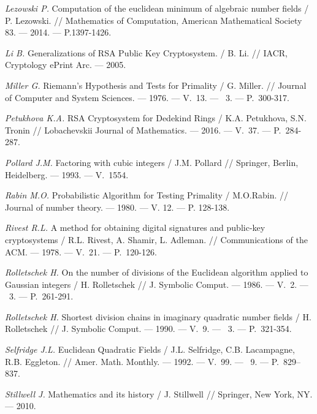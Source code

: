 \begin{thebibliography}{99}
    \textit{Lezowski P.} Computation of the euclidean minimum of algebraic number fields / P. Lezowski. // Mathematics of Computation, American Mathematical Society 83. --- 2014. --- P.1397-1426.

    \textit{Li B.} Generalizations of RSA Public Key Cryptosystem. / B. Li. // IACR, Cryptology ePrint Arc. --- 2005.

    \textit{Miller G.} Riemann's Hypothesis and Tests for Primality / G. Miller. // Journal of Computer and System Sciences. --- 1976. --- V.~13. --- ~3. --- {P.}~300-317.
    
    \textit{Petukhova K.A.} RSA Cryptosystem for Dedekind Rings / K.A. Petukhova, S.N. Tronin // Lobachevskii Journal of Mathematics. --- 2016. --- V.~37. --- P.~284-287.
    
    \textit{Pollard J.M.} Factoring with cubic integers / J.M. Pollard // Springer, Berlin, Heidelberg. --- 1993. --- V.~1554.

    \textit{Rabin M.O.} Probabilistic Algorithm for Testing Primality / M.O.Rabin. // Journal of number theory. --- 1980. --- V. 12. --- P. 128-138.
    
    \textit{Rivest R.L.} A method for obtaining digital signatures and public-key cryptosystems / R.L. Rivest, A. Shamir, L. Adleman. // Communications of the ACM. --- 1978. --- V.~21. --- P.~120-126.
    
    \textit{Rolletschek H.} On the number of divisions of the Euclidean algorithm applied to Gaussian integers / H. Rolletschek // J. Symbolic Comput. --- 1986. --- V.~2. --- \textnumero~3. --- P.~261-291.
    
    \textit{Rolletschek H.} Shortest division chains in imaginary quadratic number fields / H. Rolletschek // J. Symbolic Comput. --- 1990. --- V.~9. --- {\textnumero}~3. --- P.~321-354.

    \textit{Selfridge J.L.} Euclidean Quadratic Fields / J.L. Selfridge, C.B. Lacampagne, R.B. Eggleton. // Amer. Math. Monthly. --- 1992. --- V.~99. --- {\textnumero}~9. --- P.~829--837.

    \textit{Stillwell J.} Mathematics and its history / J. Stillwell // Springer, New York, NY. --- 2010.


\end{thebibliography}
